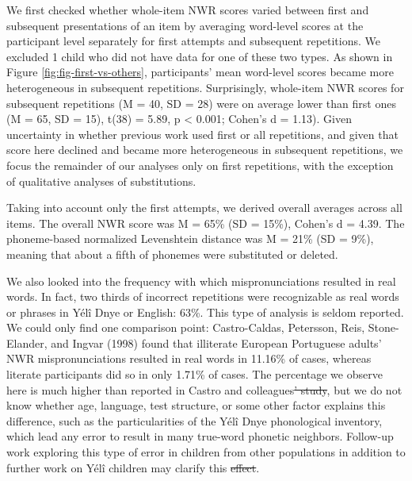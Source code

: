 \documentclass[ %
american, %
,man,floatsintext]{apa6} %
\providecommand{\DIFaddtex}[1]{{\protect\color{blue}\uwave{#1}}} %
\providecommand{\DIFdeltex}[1]{{\protect\color{red}\sout{#1}}}                      %
\providecommand{\DIFaddbegin}{} %
\providecommand{\DIFaddend}{} %
\providecommand{\DIFdelbegin}{} %
\providecommand{\DIFdelend}{} %
\providecommand{\DIFadd}[1]{\texorpdfstring{\DIFaddtex{#1}}{#1}} %
\providecommand{\DIFdel}[1]{\texorpdfstring{\DIFdeltex{#1}}{}} %
\newcommand{\DIFscaledelfig}{0.5}
\newlength{\DIFdelgraphicswidth} %
\newlength{\DIFdelgraphicsheight} %
\newcommand{\DIFaddincludegraphics}[2][]{{\color{blue}\fbox{\DIFOincludegraphics[#1]{#2}}}} %
\newcommand{\DIFdelincludegraphics}[2][]{%
	\sbox{\DIFdelgraphicsbox}{\DIFOincludegraphics[#1]{#2}}%
	\settoboxwidth{\DIFdelgraphicswidth}{\DIFdelgraphicsbox} %
	\settoboxtotalheight{\DIFdelgraphicsheight}{\DIFdelgraphicsbox} %
	\scalebox{\DIFscaledelfig}{%
		\parbox[b]{\DIFdelgraphicswidth}{\usebox{\DIFdelgraphicsbox}\\[-\baselineskip] \rule{\DIFdelgraphicswidth}{0em}}\llap{\resizebox{\DIFdelgraphicswidth}{\DIFdelgraphicsheight}{%
				\setlength{\unitlength}{\DIFdelgraphicswidth}%
				\begin{picture}(1,1)%
				\thicklines\linethickness{2pt} %
				{\color[rgb]{1,0,0}\put(0,0){\framebox(1,1){}}}%
				{\color[rgb]{1,0,0}\put(0,0){\line( 1,1){1}}}%
				{\color[rgb]{1,0,0}\put(0,1){\line(1,-1){1}}}%
				\end{picture}%
			}\hspace*{3pt}}} %
} %
\DeclareRobustCommand{\DIFaddbegin}{\DIFOaddbegin \let\includegraphics\DIFaddincludegraphics} %
\DeclareRobustCommand{\DIFaddend}{\DIFOaddend \let\includegraphics\DIFOincludegraphics} %
\DeclareRobustCommand{\DIFdelbegin}{\DIFOdelbegin \let\includegraphics\DIFdelincludegraphics} %
\DeclareRobustCommand{\DIFdelend}{\DIFOaddend \let\includegraphics\DIFOincludegraphics} %
\begin{document}
We first checked whether whole-item NWR scores varied between first and subsequent presentations of an item by averaging word-level scores at the participant level separately for first attempts and subsequent repetitions. We excluded 1 child who did not have data for one of these two types. As shown in Figure \ref{fig:fig-first-vs-others}, participants' mean word-level scores became more heterogeneous in subsequent repetitions. Surprisingly, whole-item NWR scores for subsequent repetitions (M = 40, SD = 28)
were on average lower than first ones (M = 65, SD = 15), t(38) = 5.89, p \textless{} 0.001; Cohen's d = 1.13). Given uncertainty in whether previous work used first or all repetitions, and given that score here declined and became more heterogeneous in subsequent repetitions, we focus the remainder of our analyses only on first repetitions, with the exception of qualitative analyses of substitutions.

Taking into account only the first attempts, we derived overall averages across all items. The overall NWR score was M = 65\% (SD = 15\%), Cohen's d = 4.39. The phoneme-based normalized Levenshtein distance was M = 21\% (SD = 9\%), meaning that about a fifth of phonemes were substituted or deleted.

We also looked into the frequency with which mispronunciations resulted in real words. In fact, two thirds of incorrect repetitions were recognizable as real words or phrases in Yélî Dnye or English: 63\%. This type of analysis is seldom reported. We could only find one comparison point: Castro-Caldas, Petersson, Reis, Stone-Elander, and Ingvar (1998) found that illiterate European Portuguese adults' NWR mispronunciations resulted in real words in 11.16\% of cases, whereas literate participants did so in only 1.71\% of cases. The percentage we observe here is much higher than reported in \DIFaddbegin \DIFadd{the study by }\DIFaddend Castro and colleagues\DIFdelbegin \DIFdel{' study}\DIFdelend , but we do not know whether age, language, test structure, or some other factor explains this difference, such as the particularities of the Yélî Dnye phonological inventory, which lead any error to result in many true-word phonetic neighbors. Follow-up work exploring this type of error in children from other populations in addition to further work on Yélî children may clarify this \DIFdelbegin \DIFdel{effect}\DIFdelend \DIFaddbegin \DIFadd{association}\DIFaddend .
\end{document}
